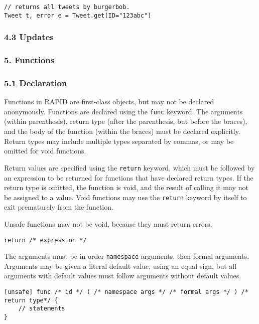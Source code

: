 \begin{verbatim}
// returns all tweets by burgerbob.
Tweet t, error e = Tweet.get(ID="123abc")
\end{verbatim}

\subsubsection{4.3 Updates}\label{updates}

\subsubsection{5. Functions}\label{functions-1}

\subsubsection{5.1 Declaration}\label{declaration}

Functions in RAPID are first-class objects, but may not be declared
anonymously. Functions are declared using the \texttt{func} keyword. The
arguments (within parenthesis), return type (after the parenthesis, but
before the braces), and the body of the function (within the braces)
must be declared explicitly. Return types may include multiple types
separated by commas, or may be omitted for void functions.

Return values are specified using the \texttt{return} keyword, which
must be followed by an expression to be returned for functions that have
declared return types. If the return type is omitted, the function is
void, and the result of calling it may not be assigned to a value. Void
functions may use the \texttt{return} keyword by itself to exit
prematurely from the function.

Unsafe functions may not be void, because they must return errors.

\begin{verbatim}
return /* expression */
\end{verbatim}

The arguments must be in order \texttt{namespace} arguments, then formal
arguments. Arguments may be given a literal default value, using an
equal sign, but all arguments with default values must follow arguments
without default values.

\begin{verbatim}
[unsafe] func /* id */ ( /* namespace args */ /* formal args */ ) /* return type*/ {
    // statements
}
\end{verbatim}


